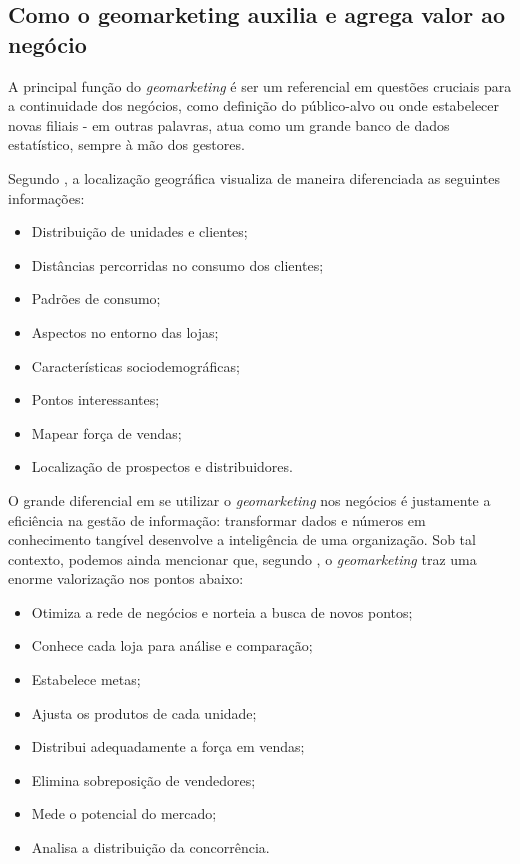 \subsection{Como o geomarketing auxilia e agrega valor ao negócio}
\label{importancia}
A principal função do \emph{geomarketing} é ser um referencial em questões cruciais para a continuidade dos negócios, como definição do público-alvo ou onde estabelecer novas filiais - em outras palavras, atua como um grande banco de dados estatístico, sempre à mão dos gestores. 

Segundo , a localização geográfica visualiza de maneira diferenciada as seguintes informações:

\begin{itemize}
  \item Distribuição de unidades e clientes;
  \item Distâncias percorridas no consumo dos clientes;
  \item Padrões de consumo;
  \item Aspectos no entorno das lojas;
  \item Características sociodemográficas;
  \item Pontos interessantes;
  \item Mapear força de vendas;
  \item Localização de prospectos e distribuidores.
\end{itemize}

O grande diferencial em se utilizar o \emph{geomarketing} nos negócios é justamente a eficiência na gestão de informação: transformar dados e números em conhecimento tangível desenvolve a inteligência de uma organização. Sob tal contexto, podemos ainda mencionar que, segundo , o \emph{geomarketing} traz uma enorme valorização nos pontos abaixo:

\begin{itemize}
  \item Otimiza a rede de negócios e norteia a busca de novos pontos;
  \item Conhece cada loja para análise e comparação;
  \item Estabelece metas;
  \item Ajusta os produtos de cada unidade;
  \item Distribui adequadamente a força em vendas;
  \item Elimina sobreposição de vendedores;
  \item Mede o potencial do mercado;
  \item Analisa a distribuição da concorrência.
\end{itemize}

